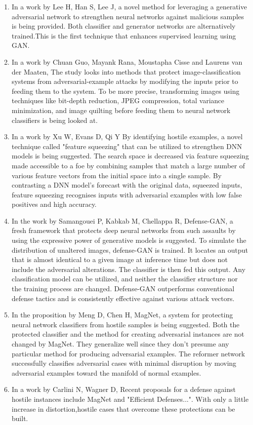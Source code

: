 \documentclass[ 12pt,a4paper,twocolumn,fleqn]{article}
\begin{document}
\begin{enumerate}
    \item In a work by Lee H, Han S, Lee J, a novel method for leveraging a generative adversarial network to strengthen neural networks against malicious samples is being provided. Both classifier and generator networks are alternatively trained.This is the first technique that enhances supervised learning using GAN.
    \item In a work by Chuan Guo, Mayank Rana, Moustapha Cisse and Laurens van der Maaten, The study looks into methods that protect image-classification systems from adversarial-example attacks by modifying the inputs prior to feeding them to the system. To be more precise, transforming images using techniques like bit-depth reduction, JPEG compression, total variance minimization, and image quilting before feeding them to neural network classifiers is being looked at.
    \item In a work by Xu W, Evans D, Qi Y By identifying hostile examples, a novel technique called "feature squeezing" that can be utilized to strengthen DNN models is being suggested. The search space is decreased via feature squeezing made accessible to a foe by combining samples that match a large number of various feature vectors from the initial space into a single sample. By contrasting a DNN model's forecast with the original data, squeezed inputs, feature squeezing recognises inputs with adversarial examples with low false positives and high accuracy.
    \item In the work by Samangouei P, Kabkab M, Chellappa R, Defense-GAN, a fresh framework that protects deep neural networks from such assaults by using the expressive power of generative models is suggested. To simulate the distribution of unaltered images, defense-GAN is trained. It locates an output that is almost identical to a given image at inference time but does not include the adversarial alterations. The classifier is then fed this output. Any classification model can be utilized, and neither the classifier structure nor the training process are changed. Defense-GAN outperforms conventional defense tactics and is consistently effective against various attack vectors.
    \item In the proposition by Meng D, Chen H, MagNet, a system for protecting neural network classifiers from hostile samples is being suggested. Both the protected classifier and the method for creating adversarial instances are not changed by MagNet. They generalize well since they don't presume any particular method for producing adversarial examples. The reformer network successfully classifies adversarial cases with minimal disruption by moving adversarial examples toward the manifold of normal examples.
    \item In a work by Carlini N, Wagner D, Recent proposals for a defense against hostile instances include MagNet and "Efficient Defenses...". With only a little increase in distortion,hostile cases that overcome these protections can be built.
\end{enumerate}
\newpage
\end{document}
